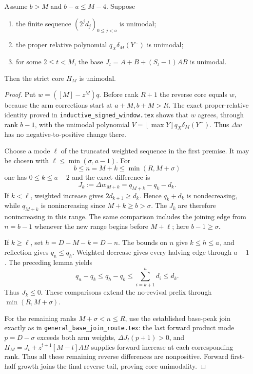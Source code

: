 \begin{proposition}
Assume $b>M$ and $b-a\le M-4$. Suppose
\begin{enumerate}
\item the finite sequence $(2^jd_j)_{0\le j<a}$ is unimodal;
\item the proper relative polynomial $q_X\delta_M(Y^-)$ is unimodal;
\item for some $2\le t<M$, the base
$J_t=A+B+(S_t-1)AB$ is unimodal.
\end{enumerate}
Then the strict core $H_M$ is unimodal.
\end{proposition}
\begin{proof}
Put $w=([M]-z^M)q$. Before rank $R+1$ the reverse core
equals $w$, because the arm corrections start at $a+M,b+M>R$.
The exact proper-relative identity proved in
\texttt{inductive\_signed\_window.tex} shows that $w$ agrees,
through rank $b-1$, with the unimodal polynomial
$V=[\max Y]q_X\delta_M(Y^-)$.
Thus $\Delta w$ has no negative-to-positive change there.

Choose a mode $\ell$ of the truncated weighted sequence in
the first premise. It may be chosen with
$\ell\le\min(\sigma,a-1)$. For
\[
              b\le n=M+k\le\min(R,M+\sigma)
\]
one has $0\le k\le a-2$ and the exact difference is
\[
                   J_k:=\Delta w_{M+k}=q_{M+k}-q_k-d_k.
\]
If $k<\ell$, weighted increase gives
$2d_{k+1}\ge d_k$. Hence $q_k+d_k$ is nondecreasing,
while $q_{M+k}$ is nonincreasing since $M+k\ge b>\sigma$.
The $J_k$ are therefore nonincreasing in this range. The same
comparison includes the joining edge from $n=b-1$ whenever
the new range begins before $M+\ell$; here $b-1\ge\sigma$.

If $k\ge\ell$, set $h=D-M-k=D-n$. The bounds on $n$
give $k\le h\le a$, and reflection gives $q_n\le q_h$.
Weighted decrease gives every halving edge through $a-1$.
The preceding lemma yields
\[
 q_n-q_k\le q_h-q_k
       \le\sum_{i=k+1}^{h}d_i\le d_k.
\]
Thus $J_k\le0$. These comparisons extend the no-revival
prefix through $\min(R,M+\sigma)$.

For the remaining ranks $M+\sigma<n\le R$, use the established
base-peak join exactly as in \texttt{general\_base\_join\_route.tex}:
the last forward product mode $p=D-\sigma$ exceeds both arm weights,
$\Delta J_t(p+1)>0$, and
$H_M=J_t+z^{t+1}[M-t]AB$ supplies forward increase at each
corresponding rank. Thus all these remaining reverse differences
are nonpositive. Forward first-half growth joins the final reverse
tail, proving core unimodality.
\end{proof}

